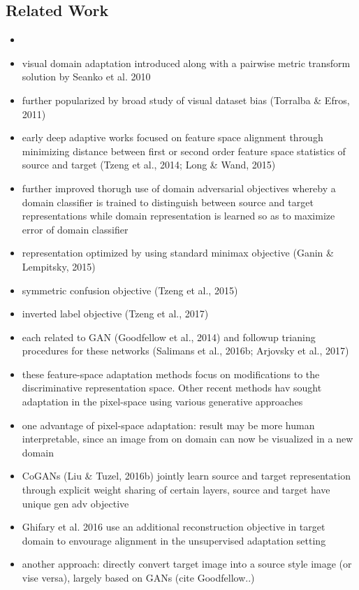 \subsection{Related Work}

\begin{itemize}
	\item {}
	\item visual domain adaptation introduced along with a pairwise metric transform solution by Seanko et al. 2010
	\item further popularized by broad study of visual dataset bias (Torralba \& Efros, 2011)
	\item early deep adaptive works focused on feature space alignment through minimizing distance between first or second order feature space statistics of source and target (Tzeng et al., 2014; Long \& Wand, 2015)
	\item further improved thorugh use of domain adversarial objectives whereby a domain classifier is trained to distinguish between source and target representations while domain representation is learned so as to maximize error of domain classifier
	\item representation optimized by using standard minimax objective (Ganin \& Lempitsky, 2015)
	\item symmetric confusion objective (Tzeng et al., 2015)
	\item inverted label objective (Tzeng et al., 2017)
	\item each related to GAN (Goodfellow et al., 2014) and followup trianing procedures for these networks (Salimans et al., 2016b; Arjovsky et al., 2017)
	\item these feature-space adaptation methods focus on modifications to the discriminative representation space. Other recent methods hav sought adaptation in the pixel-space using various generative approaches
	\item one advantage of pixel-space adaptation: result may be more human interpretable, since an image from on domain can now be visualized in a new domain
	\item CoGANs (Liu \& Tuzel, 2016b) jointly learn source and target representation through explicit weight sharing of certain layers, source and target have unique gen adv objective
	\item Ghifary et al. 2016 use an additional reconstruction objective in target domain to envourage alignment in the unsupervised adaptation setting
	\item another approach: directly convert target image into a source style image (or vise versa), largely based on GANs (cite Goodfellow..)

\end{itemize}
